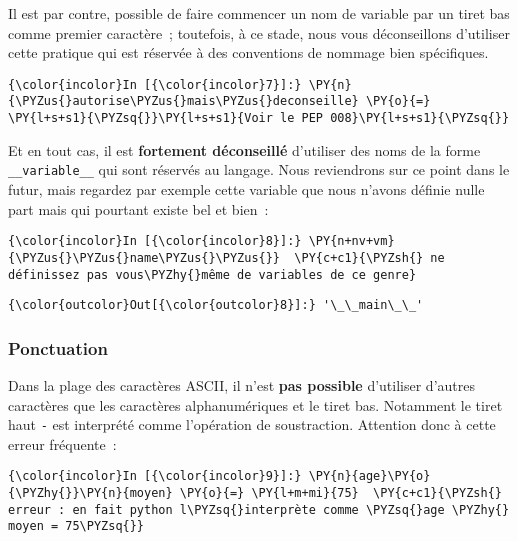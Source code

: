     Il est par contre, possible de faire commencer un nom de variable par un
tiret bas comme premier caractère~; toutefois, à ce stade, nous vous
déconseillons d'utiliser cette pratique qui est réservée à des
conventions de nommage bien spécifiques.

    \begin{Verbatim}[commandchars=\\\{\}]
{\color{incolor}In [{\color{incolor}7}]:} \PY{n}{\PYZus{}autorise\PYZus{}mais\PYZus{}deconseille} \PY{o}{=} \PY{l+s+s1}{\PYZsq{}}\PY{l+s+s1}{Voir le PEP 008}\PY{l+s+s1}{\PYZsq{}}
\end{Verbatim}


    Et en tout cas, il est \textbf{fortement déconseillé} d'utiliser des
noms de la forme \texttt{\_\_variable\_\_} qui sont réservés au langage.
Nous reviendrons sur ce point dans le futur, mais regardez par exemple
cette variable que nous n'avons définie nulle part mais qui pourtant
existe bel et bien~:

    \begin{Verbatim}[commandchars=\\\{\}]
{\color{incolor}In [{\color{incolor}8}]:} \PY{n+nv+vm}{\PYZus{}\PYZus{}name\PYZus{}\PYZus{}}  \PY{c+c1}{\PYZsh{} ne définissez pas vous\PYZhy{}même de variables de ce genre}
\end{Verbatim}


\begin{Verbatim}[commandchars=\\\{\}]
{\color{outcolor}Out[{\color{outcolor}8}]:} '\_\_main\_\_'
\end{Verbatim}
            
    \hypertarget{ponctuation}{%
\subsubsection{Ponctuation}\label{ponctuation}}

    Dans la plage des caractères ASCII, il n'est \textbf{pas possible}
d'utiliser d'autres caractères que les caractères alphanumériques et le
tiret bas. Notamment le tiret haut \texttt{-} est interprété comme
l'opération de soustraction. Attention donc à cette erreur fréquente~:

    \begin{Verbatim}[commandchars=\\\{\}]
{\color{incolor}In [{\color{incolor}9}]:} \PY{n}{age}\PY{o}{\PYZhy{}}\PY{n}{moyen} \PY{o}{=} \PY{l+m+mi}{75}  \PY{c+c1}{\PYZsh{} erreur : en fait python l\PYZsq{}interprète comme \PYZsq{}age \PYZhy{} moyen = 75\PYZsq{}}
\end{Verbatim}


